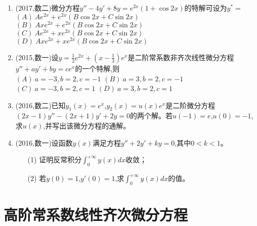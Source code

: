 \documentclass[12pt, a4paper, oneside, UTF8]{ctexbook}
\begin{document}
\begin{enumerate}[label=\arabic*.,start=8]
    \item (2017,数二)微分方程$y''-4y'+8y=e^{2x}(1+\cos2x)$的特解可设为$y^*=$ \\
        $(A)\ Ae^{2x}+e^{2x}(B\cos2x+C\sin2x)$ \\
        $(B)\ Axe^{2x}+e^{2x}(B\cos2x+C\sin2x)$ \\
        $(C)\ Ae^{2x}+xe^{2x}(B\cos2x+C\sin2x)$ \\
        $(D)\ Axe^{2x}+xe^{2x}(B\cos2x+C\sin2x)$
    
    \begin{solution}
    \newpage
    \end{solution}
    
    \item (2015,数一)设$y=\frac{1}{2}e^{2x}+(x-\frac{1}{3})e^x$是二阶常系数非齐次线性微分方程$y''+ay'+by=ce^x$的一个特解,则 \\
    $(A)\ a=-3,b=2,c=-1$ \qquad
    $(B)\ a=3,b=2,c=-1$ \\
    $(C)\ a=-3,b=2,c=1$ \qquad
    $(D)\ a=3,b=2,c=1$ 
    
    \begin{solution}
    \newpage
    \end{solution}
    
    \item (2016,数二)已知$y_1(x)=e^x$,$y_2(x)=u(x)e^x$是二阶微分方程$(2x-1)y''-(2x+1)y'+2y=0$的两个解。若$u(-1)=e$,$u(0)=-1$,求$u(x)$,并写出该微分方程的通解。
    
    \begin{solution}
    \newpage
    \end{solution}
    
    \item (2016,数一)设函数$y(x)$满足方程$y''+2y'+ky=0$,其中$0<k<1$。
    \begin{enumerate}[label=(\roman*)]
        \item[(1)] 证明反常积分$\int_0^{+\infty}y(x)dx$收敛；
        \item[(2)] 若$y(0)=1$,$y'(0)=1$,求$\int_0^{+\infty}y(x)dx$的值。
    \end{enumerate}
    
    \begin{solution}
    \newpage
    \end{solution}
\end{enumerate}

\section{ 高阶常系数线性齐次微分方程}
\end{document}

